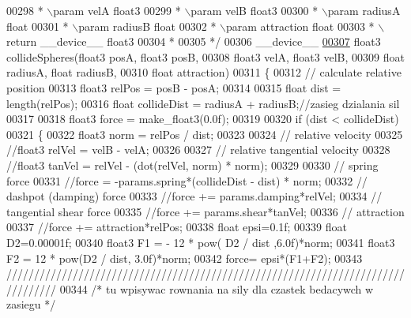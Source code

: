 \begin{DoxyCode}
00298 \textcolor{comment}{ * \(\backslash\)param velA float3}
00299 \textcolor{comment}{ * \(\backslash\)param velB float3}
00300 \textcolor{comment}{ * \(\backslash\)param radiusA float}
00301 \textcolor{comment}{ * \(\backslash\)param radiusB float}
00302 \textcolor{comment}{ * \(\backslash\)param attraction float}
00303 \textcolor{comment}{ * \(\backslash\)return \_\_device\_\_ float3}
00304 \textcolor{comment}{ *}
00305 \textcolor{comment}{ */}
00306 \_\_device\_\_
\hypertarget{particles__kernel__impl_8cuh_source_l00307}{}\hyperlink{particles__kernel__impl_8cuh_a1d93cb067b16b4a472e9c1a08d9d8e68}{00307} float3 collideSpheres(float3 posA, float3 posB,
00308                       float3 velA, float3 velB,
00309                       \textcolor{keywordtype}{float} radiusA, \textcolor{keywordtype}{float} radiusB,
00310                       \textcolor{keywordtype}{float} attraction)
00311 \{
00312     \textcolor{comment}{// calculate relative position}
00313     float3 relPos = posB - posA;
00314 
00315     \textcolor{keywordtype}{float} dist = length(relPos);
00316     \textcolor{keywordtype}{float} collideDist = radiusA + radiusB;\textcolor{comment}{//zasieg dzialania sil}
00317 
00318     float3 force = make\_float3(0.0f);
00319 
00320     \textcolor{keywordflow}{if} (dist < collideDist)
00321     \{
00322         float3 norm = relPos / dist;
00323 
00324         \textcolor{comment}{// relative velocity}
00325         \textcolor{comment}{//float3 relVel = velB - velA;}
00326 
00327         \textcolor{comment}{// relative tangential velocity}
00328         \textcolor{comment}{//float3 tanVel = relVel - (dot(relVel, norm) * norm);}
00329 
00330         \textcolor{comment}{// spring force}
00331         \textcolor{comment}{//force = -params.spring*(collideDist - dist) * norm;}
00332         \textcolor{comment}{// dashpot (damping) force}
00333         \textcolor{comment}{//force += params.damping*relVel;}
00334         \textcolor{comment}{// tangential shear force}
00335         \textcolor{comment}{//force += params.shear*tanVel;}
00336         \textcolor{comment}{// attraction}
00337         \textcolor{comment}{//force += attraction*relPos;}
00338                 \textcolor{keywordtype}{float} epsi=0.1f;
00339                 \textcolor{keywordtype}{float} D2=0.00001f;
00340                 float3 F1 = - 12 * pow( D2 /  dist ,6.0f)*norm;
00341                 float3 F2 = 12 * pow(D2 / dist, 3.0f)*norm;
00342                 force= epsi*(F1+F2);
00343 \textcolor{comment}{/////////////////////////////////////////////////////////////////////////////////}
00344 \textcolor{comment}{/*      tu wpisywac rownania na sily dla czastek bedacywch w zasiegu    */}

\end{DoxyCode}
